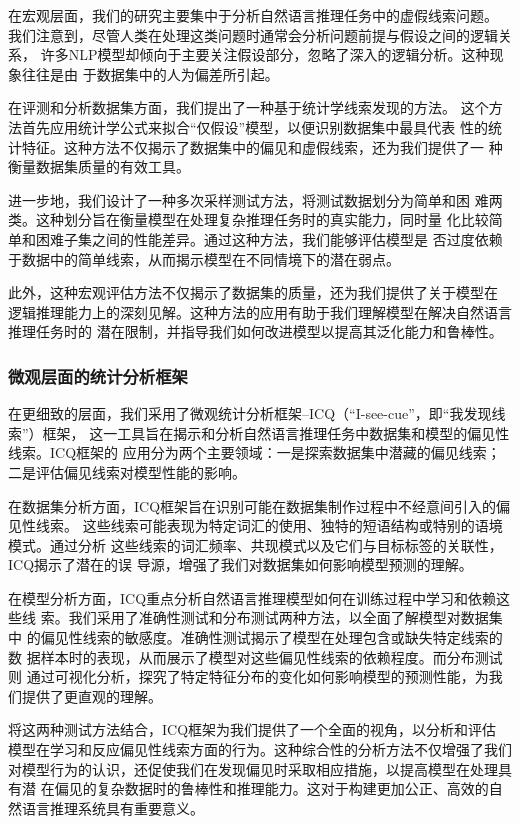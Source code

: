 在宏观层面，我们的研究主要集中于分析自然语言推理任务中的虚假线索问题。
我们注意到，尽管人类在处理这类问题时通常会分析问题前提与假设之间的逻辑关系，
许多NLP模型却倾向于主要关注假设部分，忽略了深入的逻辑分析。这种现象往往是由
于数据集中的人为偏差所引起。

在评测和分析数据集方面，我们提出了一种基于统计学线索发现的方法。
这个方法首先应用统计学公式来拟合``仅假设''模型，以便识别数据集中最具代表
性的统计特征。这种方法不仅揭示了数据集中的偏见和虚假线索，还为我们提供了一
种衡量数据集质量的有效工具。

进一步地，我们设计了一种多次采样测试方法，将测试数据划分为简单和困
难两类。这种划分旨在衡量模型在处理复杂推理任务时的真实能力，同时量
化比较简单和困难子集之间的性能差异。通过这种方法，我们能够评估模型是
否过度依赖于数据中的简单线索，从而揭示模型在不同情境下的潜在弱点。

此外，这种宏观评估方法不仅揭示了数据集的质量，还为我们提供了关于模型在
逻辑推理能力上的深刻见解。这种方法的应用有助于我们理解模型在解决自然语言推理任务时的
潜在限制，并指导我们如何改进模型以提高其泛化能力和鲁棒性。

\subsubsection*{微观层面的统计分析框架}
在更细致的层面，我们采用了微观统计分析框架--ICQ（``I-see-cue''，即``我发现线索''）框架，
这一工具旨在揭示和分析自然语言推理任务中数据集和模型的偏见性线索。ICQ框架的
应用分为两个主要领域：一是探索数据集中潜藏的偏见线索；二是评估偏见线索对模型性能的影响。

在数据集分析方面，ICQ框架旨在识别可能在数据集制作过程中不经意间引入的偏见性线索。
这些线索可能表现为特定词汇的使用、独特的短语结构或特别的语境模式。通过分析
这些线索的词汇频率、共现模式以及它们与目标标签的关联性，ICQ揭示了潜在的误
导源，增强了我们对数据集如何影响模型预测的理解。

在模型分析方面，ICQ重点分析自然语言推理模型如何在训练过程中学习和依赖这些线
索。我们采用了准确性测试和分布测试两种方法，以全面了解模型对数据集中
的偏见性线索的敏感度。准确性测试揭示了模型在处理包含或缺失特定线索的数
据样本时的表现，从而展示了模型对这些偏见性线索的依赖程度。而分布测试则
通过可视化分析，探究了特定特征分布的变化如何影响模型的预测性能，为我们提供了更直观的理解。

将这两种测试方法结合，ICQ框架为我们提供了一个全面的视角，以分析和评估
模型在学习和反应偏见性线索方面的行为。这种综合性的分析方法不仅增强了我们
对模型行为的认识，还促使我们在发现偏见时采取相应措施，以提高模型在处理具有潜
在偏见的复杂数据时的鲁棒性和推理能力。这对于构建更加公正、高效的自然语言推理系统具有重要意义。

